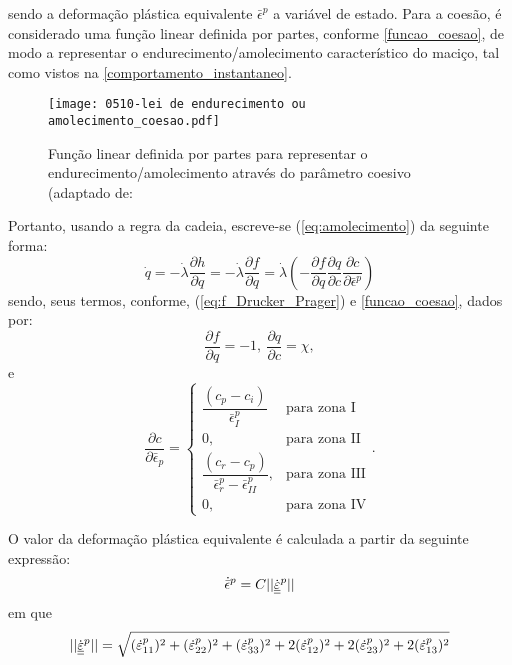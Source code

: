 sendo a deformação plástica equivalente $\bar \epsilon^p$ a variável de estado. Para a coesão, é considerado uma função linear definida por partes, conforme \autoref{funcao_coesao}, de modo a representar o endurecimento/amolecimento característico do maciço, tal como vistos na \autoref{comportamento_instantaneo}.
\begin{figure}[H]
	\begin{center}
		\texttt{[image: 0510-lei de endurecimento ou amolecimento\_coesao.pdf]}
	\end{center}
	\caption{\label{funcao_coesao}Função linear definida por partes para representar o endurecimento/amolecimento através do parâmetro coesivo (adaptado de: }
\end{figure}
Portanto, usando a regra da cadeia, escreve-se (\ref{eq:amolecimento}) da seguinte forma:
\begin{equation}
	\label{eq:expressao_amolecimento}
	\dot q = - \dot \lambda \dfrac{\partial h}{\partial q} = - \dot \lambda \dfrac{\partial f}{\partial q} = \dot \lambda \left(- \dfrac{\partial f}{\partial q}\dfrac{\partial q}{\partial c}\dfrac{\partial c}{\partial \bar \epsilon^p}\right)	
\end{equation}
sendo, seus termos, conforme, (\ref{eq:f_Drucker_Prager}) e \autoref{funcao_coesao}, dados por:
\begin{equation}
	\label{eq:dfdq}
	\dfrac{\partial f}{\partial q} = -1,~\dfrac{\partial q}{\partial c} = \chi,
\end{equation}
e
\begin{equation}
	\label{eq:dqde}
	\dfrac{\partial c}{\partial \bar \epsilon_{p}} = \left\{ \begin{array}{ll} \dfrac{(c_p-c_i)}{\bar \epsilon^p_I} &  \text{para zona I} \\ 
	0, & \text{para zona II} \\
	\dfrac{(c_r-c_p)}{\bar \epsilon^p_{r}-\bar \epsilon^p_{II}}, & \text{para zona III} \\	
	0, & \text{para zona IV}
\end{array}\right..
\end{equation}

O valor da deformação plástica equivalente é calculada a partir da seguinte expressão:
\begin{equation}
	\label{eq:epsPeq}
	\dot{{\bar \epsilon}}^p = C||\dot {\underline{\underline \varepsilon}}^p||
\end{equation}
em que
\begin{equation}
	\label{eq:epsPeq}
	||\dot {\underline{\underline \varepsilon}}^p|| = \sqrt{(\dot{\varepsilon}^{p}_{11})^2 + (\dot{\varepsilon}^{p}_{22})^2 + (\dot{\varepsilon}^{p}_{33})^2 + 2(\dot{\varepsilon}^{p}_{12})^2 + 2(\dot{\varepsilon}^{p}_{23})^2 + 2(\dot{\varepsilon}^{p}_{13})^2}
\end{equation}

